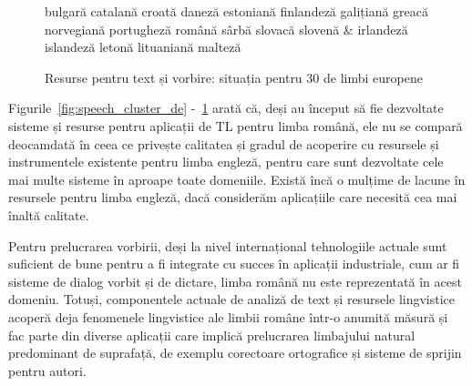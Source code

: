 \documentclass[]{../../metanetpaper}
\begin{document}
\begin{multicols}{2}
\begin{figure}[tb]
\begin{tabular}
bulgară\newline 
catalană \newline 
croată \newline 
daneză \newline 
estoniană \newline 
finlandeză \newline 
galițiană \newline 
greacă \newline 
norvegiană \newline 
portugheză \newline 
română \newline 
sârbă \newline 
slovacă \newline 
slovenă \newline
& \vspace*{0.5mm} irlandeză \newline 
islandeză \newline 
letonă \newline 
lituaniană \newline 
malteză \\
\end{tabular}
\caption{Resurse pentru text și vorbire: situația pentru 30 de limbi europene}
\label{fig:resources_cluster_de}
\end{figure}

Figurile~\ref{fig:speech_cluster_de} -~\ref{fig:resources_cluster_de} arată că, deși au început să fie dezvoltate sisteme și resurse pentru aplicații de TL pentru limba română, ele nu se compară deocamdată în ceea ce privește calitatea și gradul de acoperire cu resursele și instrumentele existente pentru limba engleză, pentru care sunt dezvoltate cele mai multe sisteme în aproape toate domeniile. Există încă o mulțime de lacune în resursele pentru limba engleză, dacă considerăm aplicațiile care necesită cea mai înaltă calitate.

Pentru prelucrarea vorbirii, deși la nivel internațional tehnologiile actuale sunt suficient de bune pentru a fi integrate cu succes în aplicații industriale, cum ar fi sisteme de dialog vorbit și de dictare, limba română nu este reprezentată în acest domeniu. Totuși, componentele actuale de analiză de text și resursele lingvistice acoperă deja fenomenele lingvistice ale limbii române într-o anumită măsură și fac parte din diverse aplicații care implică prelucrarea limbajului natural predominant de suprafață, de exemplu corectoare ortografice și sisteme de sprijin pentru autori.


\end{multicols}
\end{document}
